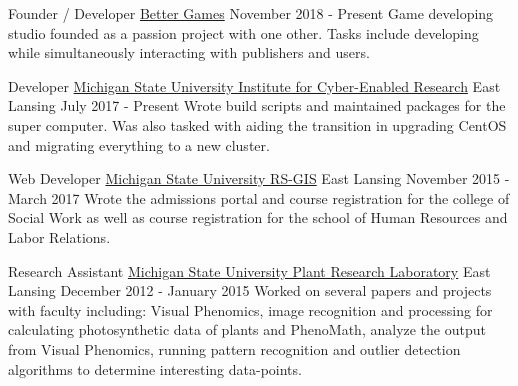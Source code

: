 
\begin{cventries}
  \cventry
    {Founder / Developer} %
    {\href{https://better-games.org}{Better Games}} %
    {} %
    {November 2018 - Present} %
    {
        {Game developing studio founded as a passion project with one other. Tasks include developing while
        simultaneously interacting with publishers and users.}
    }

  \cventry
    {Developer}
    {\href{https://icer.msu.edu}{Michigan State University Institute for Cyber-Enabled Research}}
    {East Lansing}
    {July 2017 - Present}
    {
        {Wrote build scripts and maintained packages for the super computer. Was also tasked with aiding the transition
        in upgrading CentOS and migrating everything to a new cluster.}
    }

  \cventry
    {Web Developer}
    {\href{http://www.rsgis.msu.edu}{Michigan State University RS-GIS}}
    {East Lansing}
    {November 2015 - March 2017}
    {
      {Wrote the admissions portal and course registration for the college of Social Work as well as
      course registration for the school of Human Resources and Labor Relations.}
    }

  \cventry
    {Research Assistant}
    {\href{https://prl.natsci.msu.edu/research-tech/center-for-advanced-algal-and-plant-phenotyping}{Michigan State University Plant Research Laboratory}}
    {East Lansing}
    {December 2012 - January 2015}
    {
      {Worked on several papers and projects with faculty including: Visual Phenomics, image recognition
      and processing for calculating photosynthetic data of plants and PhenoMath, analyze the output from Visual Phenomics,
      running pattern recognition and outlier detection algorithms to determine interesting data-points. }
    }
\end{cventries}
